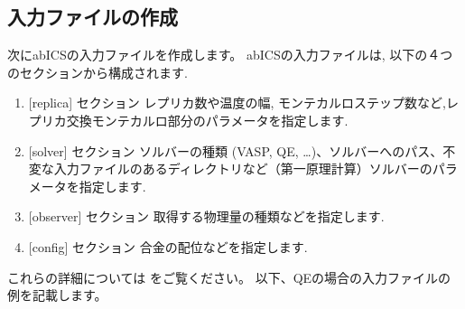 \documentclass[letterpaper,10pt,dvipdfmx]{sphinxmanual}
\begin{document}
\subsection{入力ファイルの作成}
\label{\detokenize{how_to_use/basic_usage:id3}}
次にabICSの入力ファイルを作成します。
abICSの入力ファイルは, 以下の４つのセクションから構成されます.
\begin{enumerate}
\item {} 
{[}replica{]} セクション
レプリカ数や温度の幅, モンテカルロステップ数など,レプリカ交換モンテカルロ部分のパラメータを指定します.

\item {} 
{[}solver{]} セクション
ソルバーの種類 (VASP, QE, …)、ソルバーへのパス、不変な入力ファイルのあるディレクトリなど（第一原理計算）ソルバーのパラメータを指定します.

\item {} 
{[}observer{]} セクション
取得する物理量の種類などを指定します.

\item {} 
{[}config{]} セクション
合金の配位などを指定します.

\end{enumerate}

これらの詳細については {\hyperref[\detokenize{file_specification/index::doc}]{}} をご覧ください。
以下、QEの場合の入力ファイルの例を記載します。
\end{document}
